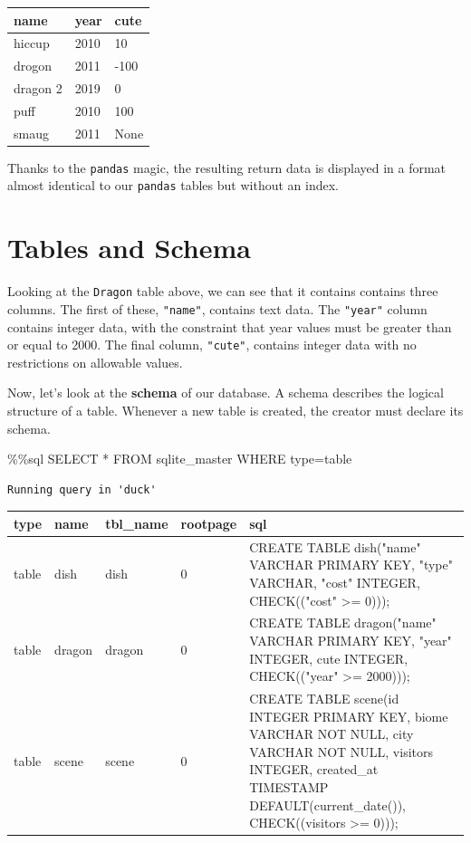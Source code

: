 \documentclass[
  letterpaper,
  DIV=11,
  numbers=noendperiod]{scrreprt}
\newenvironment{Shaded}{\begin{snugshade}}{\end{snugshade}}
\newcommand{\BuiltInTok}[1]{\textcolor[rgb]{0.00,0.23,0.31}{#1}}
\newcommand{\NormalTok}[1]{\textcolor[rgb]{0.00,0.23,0.31}{#1}}
\newcommand{\OperatorTok}[1]{\textcolor[rgb]{0.37,0.37,0.37}{#1}}
\newcommand{\StringTok}[1]{\textcolor[rgb]{0.13,0.47,0.30}{#1}}
\begin{document}
\begin{longtable}[]{@{}lll@{}}
\toprule\noalign{}
name & year & cute \\
\midrule\noalign{}
\endhead
\bottomrule\noalign{}
\endlastfoot
hiccup & 2010 & 10 \\
drogon & 2011 & -100 \\
dragon 2 & 2019 & 0 \\
puff & 2010 & 100 \\
smaug & 2011 & None \\
\end{longtable}

Thanks to the \texttt{pandas} magic, the resulting return data is
displayed in a format almost identical to our \texttt{pandas} tables but
without an index.

\section{Tables and Schema}\label{tables-and-schema}

Looking at the \texttt{Dragon} table above, we can see that it contains
contains three columns. The first of these, \texttt{"name"}, contains
text data. The \texttt{"year"} column contains integer data, with the
constraint that year values must be greater than or equal to 2000. The
final column, \texttt{"cute"}, contains integer data with no
restrictions on allowable values.

Now, let's look at the \textbf{schema} of our database. A schema
describes the logical structure of a table. Whenever a new table is
created, the creator must declare its schema.

\begin{Shaded}
\begin{Highlighting}[]
\OperatorTok{\%\%}\NormalTok{sql}
\NormalTok{SELECT }\OperatorTok{*} 
\NormalTok{FROM sqlite\_master}
\NormalTok{WHERE }\BuiltInTok{type}\OperatorTok{=}\StringTok{\textquotesingle{}table\textquotesingle{}}
\end{Highlighting}
\end{Shaded}

\begin{verbatim}
Running query in 'duck'
\end{verbatim}

\begin{longtable}[]{@{}lllll@{}}
\toprule\noalign{}
type & name & tbl\_name & rootpage & sql \\
\midrule\noalign{}
\endhead
\bottomrule\noalign{}
\endlastfoot
table & dish & dish & 0 & CREATE TABLE dish("name" VARCHAR PRIMARY KEY,
"type" VARCHAR, "cost" INTEGER, CHECK(("cost" \textgreater= 0))); \\
table & dragon & dragon & 0 & CREATE TABLE dragon("name" VARCHAR PRIMARY
KEY, "year" INTEGER, cute INTEGER, CHECK(("year" \textgreater=
2000))); \\
table & scene & scene & 0 & CREATE TABLE scene(id INTEGER PRIMARY KEY,
biome VARCHAR NOT NULL, city VARCHAR NOT NULL, visitors INTEGER,
created\_at TIMESTAMP DEFAULT(current\_date()), CHECK((visitors
\textgreater= 0))); \\
\end{longtable}
\end{document}
